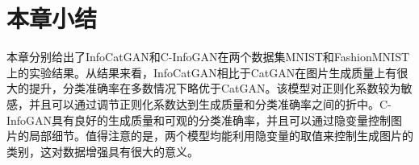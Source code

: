 \section{本章小结}
本章分别给出了InfoCatGAN和C-InfoGAN在两个数据集MNIST和FashionMNIST上的实验结果。从结果来看，InfoCatGAN相比于CatGAN在图片生成质量上有很大的提升，分类准确率在多数情况下略优于CatGAN。该模型对正则化系数较为敏感，并且可以通过调节正则化系数达到生成质量和分类准确率之间的折中。C-InfoGAN具有良好的生成质量和可观的分类准确率，并且可以通过隐变量控制图片的局部细节。值得注意的是，两个模型均能利用隐变量的取值来控制生成图片的类别，这对数据增强具有很大的意义。

